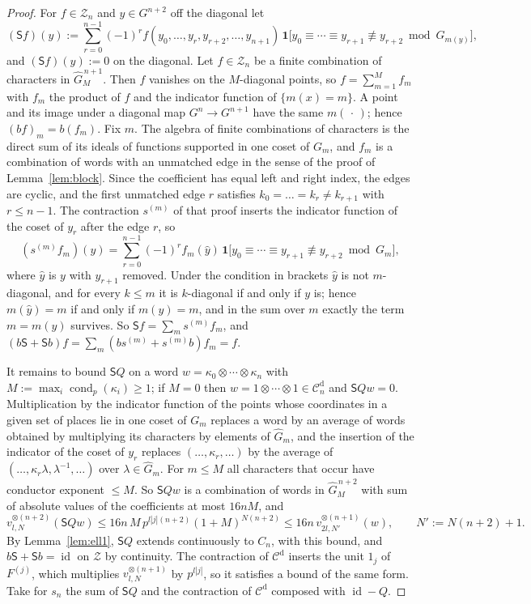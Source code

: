 \documentclass[11pt]{amsart}
\theoremstyle{definition}
\theoremstyle{remark}
\newcommand{\id}{\operatorname{id}}
\newcommand{\cond}{\operatorname{cond}}
\begin{document}
\begin{proof}
For $f\in\mathcal Z_n$ and $y\in G^{n+2}$ off the diagonal let
\[
(\mathsf Sf)(y):=\sum_{r=0}^{n-1}(-1)^{r}f(y_0,\dots,y_r,y_{r+2},\dots,y_{n+1})\,
\mathbf 1\bigl[y_0\equiv\cdots\equiv y_{r+1}\not\equiv y_{r+2}\bmod G_{m(y)}\bigr],
\]
and $(\mathsf Sf)(y):=0$ on the diagonal.  Let $f\in\mathcal Z_n$ be a finite
combination of characters in $\widehat G_M^{\,n+1}$.  Then $f$ vanishes on the $M$-diagonal points,
so $f=\sum_{m=1}^{M}f_m$ with $f_m$ the product of $f$ and the indicator
function of $\{m(x)=m\}$.  A point and its image under a diagonal map
$G^{n}\to G^{n+1}$ have the same $m(\,\cdot\,)$; hence $(bf)_m=b(f_m)$.  Fix
$m$.  The algebra of finite combinations of characters is the direct sum of
its ideals of functions supported in one coset of $G_m$, and $f_m$ is a
combination of words with an unmatched edge in the sense of the proof of
Lemma~\ref{lem:block}.  Since the coefficient has equal left and right index, the edges are
cyclic, and the first unmatched edge $r$ satisfies
$k_0=\dots=k_r\ne k_{r+1}$ with $r\le n-1$.  The contraction $s^{(m)}$ of that
proof inserts the indicator function of the coset of $y_r$ after the edge $r$,
so
\[
(s^{(m)}f_m)(y)=\sum_{r=0}^{n-1}(-1)^{r}f_m(\hat y)\,
\mathbf 1\bigl[y_0\equiv\cdots\equiv y_{r+1}\not\equiv y_{r+2}\bmod G_m\bigr],
\]
where $\hat y$ is $y$ with $y_{r+1}$ removed.  Under the condition in brackets
$\hat y$ is not $m$-diagonal, and for every $k\le m$ it is $k$-diagonal if and
only if $y$ is; hence $m(\hat y)=m$ if and only if $m(y)=m$, and in the sum over
$m$ exactly the term $m=m(y)$ survives.  So $\mathsf Sf=\sum_ms^{(m)}f_m$,
and $(b\mathsf S+\mathsf Sb)f=\sum_m(bs^{(m)}+s^{(m)}b)f_m=f$.

It remains to bound $\mathsf SQ$ on a word $w=\kappa_0\otimes\cdots\otimes\kappa_n$
with $M:=\max_i\cond_p(\kappa_i)\ge1$; if $M=0$ then
$w=1\otimes\cdots\otimes1\in\mathcal C^{\mathrm d}_n$ and $\mathsf SQw=0$. 
Multiplication by the indicator
function of the points whose coordinates in a given set of places lie in one
coset of $G_m$ replaces a word by an average of words obtained by multiplying
its characters by elements of $\widehat G_m$, and the insertion of the indicator
of the coset of $y_r$ replaces $(\dots,\kappa_r,\dots)$ by the average of
$(\dots,\kappa_r\lambda,\lambda^{-1},\dots)$ over $\lambda\in\widehat G_m$.  For
$m\le M$ all characters that occur have conductor exponent $\le M$.  So
$\mathsf SQw$ is a combination of words in $\widehat G_M^{\,n+2}$ with sum of absolute
values of the coefficients at most $16nM$, and
\[
v_{l,N}^{\otimes(n+2)}(\mathsf SQw)\le16n\,M\,p^{l|j|(n+2)}(1+M)^{N(n+2)}
\le16n\,v_{2l,N'}^{\otimes(n+1)}(w),\qquad N':=N(n+2)+1 .
\]
By Lemma~\ref{lem:ell1}, $\mathsf SQ$ extends continuously to $C_n$, with this
bound, and $b\mathsf S+\mathsf Sb=\id$ on $\mathcal Z$ by continuity.  The
contraction of $\mathcal C^{\mathrm d}$ inserts the unit $1_j$ of $F^{(j)}$, which
multiplies $v_{l,N}^{\otimes(n+1)}$ by $p^{l|j|}$, so it satisfies a bound of the
same form.  Take for $s_n$ the sum of $\mathsf SQ$ and the contraction of
$\mathcal C^{\mathrm d}$ composed with $\id-Q$.
\end{proof}
\end{document}
